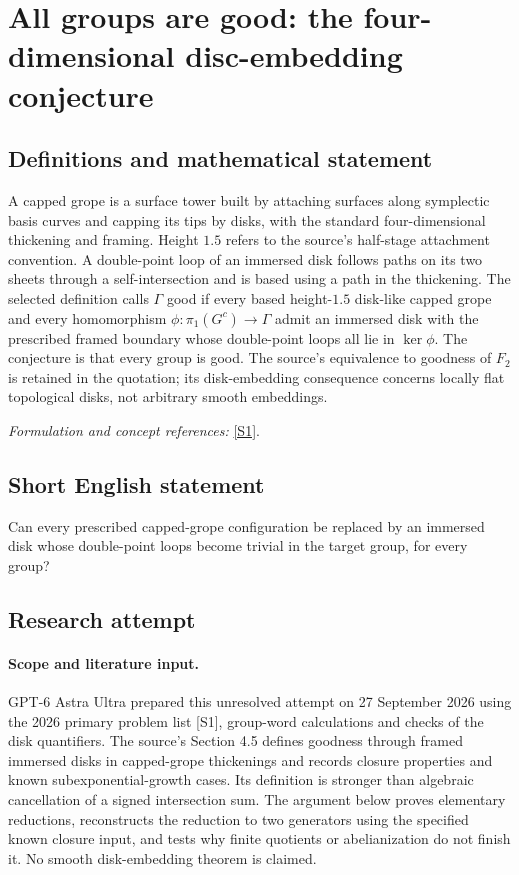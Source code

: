 \documentclass[11pt]{article}
\begin{document}
\section*{\texorpdfstring{All groups are good: the four-dimensional disc-embedding conjecture}{All groups are good: the four-dimensional disc-embedding conjecture}}\label{statement}
\subsection{Definitions and mathematical statement}
A capped grope is a surface tower built by attaching surfaces along symplectic basis curves and capping its tips by disks, with the standard four-dimensional thickening and framing. Height $1.5$ refers to the source's half-stage attachment convention. A double-point loop of an immersed disk follows paths on its two sheets through a self-intersection and is based using a path in the thickening. The selected definition calls $\Gamma$ good if every based height-$1.5$ disk-like capped grope and every homomorphism
$\phi:\pi_1(G^c)\to\Gamma$ admit an immersed disk with the prescribed framed boundary whose double-point loops all lie in $\ker\phi$. The conjecture is that every group is good. The source's equivalence to goodness of $F_2$ is retained in the quotation; its disk-embedding consequence concerns locally flat topological disks, not arbitrary smooth embeddings.
\par\smallskip\textit{Formulation and concept references:} \href{https://bpb-us-e2.wpmucdn.com/websites.umass.edu/dist/b/22144/files/2026/04/K3-problem-list-watermarked.pdf}{[S1]}.

\subsection{Short English statement}
Can every prescribed capped-grope configuration be replaced by an immersed disk whose double-point loops become trivial in the target group, for every group?
\subsection{Research attempt}
\paragraph{Scope and literature input.}
GPT-6 Astra Ultra prepared this unresolved attempt on 27 September 2026
using the 2026 primary problem list [S1], group-word calculations and
checks of the disk quantifiers. The source's Section 4.5 defines goodness
through framed immersed disks in capped-grope thickenings and records
closure properties and known subexponential-growth cases. Its definition
is stronger than algebraic cancellation of a signed intersection sum.
The argument below proves elementary reductions, reconstructs the
reduction to two generators using the specified known closure input,
and tests why finite quotients or abelianization do not finish it.
No smooth disk-embedding theorem is claimed.
\end{document}
